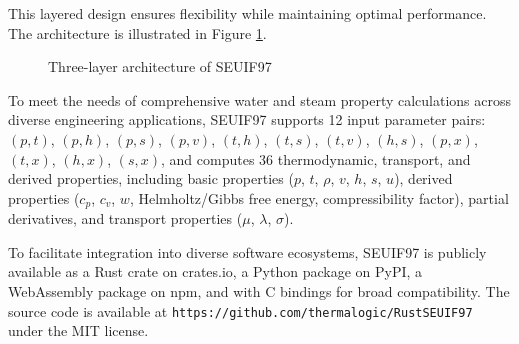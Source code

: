 \documentclass{article}
\begin{document}
This layered design ensures flexibility while maintaining optimal performance. The architecture is illustrated in Figure \ref{fig:architecture}.

\begin{figure}[H]
\centering
{}
\caption{Three-layer architecture of SEUIF97}
\label{fig:architecture}
\end{figure}

To meet the needs of comprehensive water and steam property calculations across diverse engineering applications, SEUIF97 supports 12 input parameter pairs: $(p,t)$, $(p,h)$, $(p,s)$, $(p,v)$, $(t,h)$, $(t,s)$, $(t,v)$, $(h,s)$, $(p,x)$, $(t,x)$, $(h,x)$, $(s,x)$, and computes 36 thermodynamic, transport, and derived properties, including basic properties ($p$, $t$, $\rho$, $v$, $h$, $s$, $u$), derived properties ($c_p$, $c_v$, $w$, Helmholtz/Gibbs free energy, compressibility factor), partial derivatives, and transport properties ($\mu$, $\lambda$, $\sigma$).

To facilitate integration into diverse software ecosystems, SEUIF97 is publicly available as a Rust crate on crates.io, a Python package on PyPI, a WebAssembly package on npm, and with C bindings for broad compatibility. The source code is available at \texttt{https://github.com/thermalogic/RustSEUIF97} under the MIT license.
\end{document}
